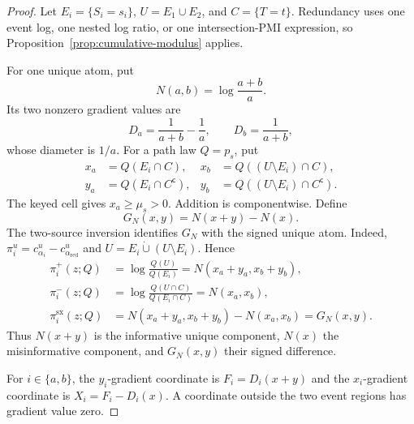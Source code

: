 \documentclass[11pt]{article}
\theoremstyle{definition}
\newcommand{\sx}{\mathrm{sx}}
\begin{document}
\begin{proof}
Let $E_i=\{S_i=s_i\}$, $U=E_1\cup E_2$, and $C=\{T=t\}$.  Redundancy uses one event log, one
nested log ratio, or one intersection-PMI expression, so
Proposition~\ref{prop:cumulative-modulus} applies.

For one unique atom, put
\begin{equation}
  N(a,b)=\log\frac{a+b}{a}.
\end{equation}
Its two nonzero gradient values are
\begin{equation}
  D_a=\frac1{a+b}-\frac1a,
  \qquad
  D_b=\frac1{a+b},
\end{equation}
whose diameter is $1/a$.  For a path law $Q=p_s$, put
\begin{align}
  x_a&=Q(E_i\cap C),&
  x_b&=Q((U\setminus E_i)\cap C),\\
  y_a&=Q(E_i\cap C^{\mathsf c}),&
  y_b&=Q((U\setminus E_i)\cap C^{\mathsf c}).
\end{align}
The keyed cell gives $x_a\ge\mu_s>0$.  Addition is componentwise.  Define
\begin{equation}
  G_N(x,y)=N(x+y)-N(x).
\end{equation}
The two-source inversion identifies $G_N$ with the signed unique atom.  Indeed,
$\pi_i^u=c_{\alpha_i}^u-c_{\alpha_{\mathrm{red}}}^u$ and
$U=E_i\mathbin{\dot\cup}(U\setminus E_i)$.  Hence
\begin{align}
  \pi_i^+(z;Q)
    &=\log\frac{Q(U)}{Q(E_i)}
      =N(x_a+y_a,x_b+y_b),\\
  \pi_i^-(z;Q)
    &=\log\frac{Q(U\cap C)}{Q(E_i\cap C)}
      =N(x_a,x_b),\\
  \pi_i^\sx(z;Q)
    &=N(x_a+y_a,x_b+y_b)-N(x_a,x_b)
      =G_N(x,y).
\end{align}
Thus $N(x+y)$ is the informative unique component, $N(x)$ the misinformative component, and
$G_N(x,y)$ their signed difference.

For $i\in\{a,b\}$, the $y_i$-gradient coordinate is $F_i=D_i(x+y)$ and the
$x_i$-gradient coordinate is $X_i=F_i-D_i(x)$.  A coordinate outside the two event regions has
gradient value zero.


\end{proof}
\end{document}
